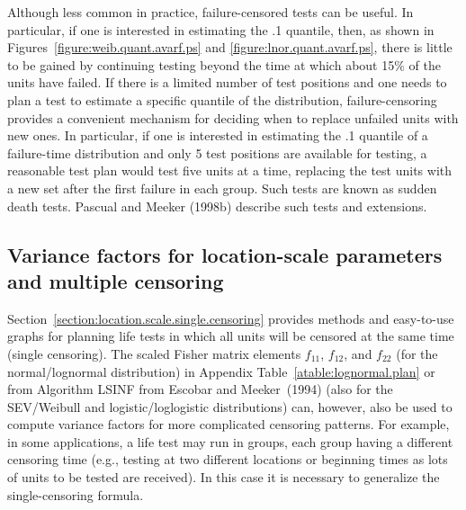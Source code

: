 Although less common in practice, failure-censored tests can be
useful. In particular, if one is interested in estimating the .1
quantile, then, as shown in Figures~\ref{figure:weib.quant.avarf.ps}
and
\ref{figure:lnor.quant.avarf.ps}, there is little to be gained by
continuing testing beyond the time at which about 15\% of
the units have failed.  If there is a limited number of test
positions and one needs to plan a test to estimate a specific
quantile of the distribution, failure-censoring provides a
convenient mechanism for deciding when to replace unfailed units
with new ones. In particular, if one is interested in estimating the
.1 quantile of a failure-time distribution and only 5 test positions
are available for testing, a reasonable test plan would test five
units at a time, replacing the test units with a new set after the
first failure in each group. Such tests are known as sudden death
tests. Pascual and Meeker (1998b) describe such tests and
extensions.

\subsection{Variance factors for location-scale 
	parameters and multiple censoring}
\label{section:location.scale.mul.censoring}
Section~\ref{section:location.scale.single.censoring} provides
methods and easy-to-use graphs for planning life tests in which all
units will be censored at the same time (single censoring).  The
scaled Fisher matrix elements $f_{11}$, $f_{12}$, and $f_{22}$ (for
the normal/lognormal distribution) in Appendix
Table~\ref{atable:lognormal.plan} or from Algorithm LSINF from
Escobar and Meeker~(1994) (also for the SEV/Weibull and
logistic/loglogistic distributions) can, however, also be used to
compute variance factors for more complicated censoring patterns.
For example, in some applications, a life test may run in groups,
each group having a different censoring time (e.g., testing at two
different locations or beginning times as lots of units to be tested
are received).  In this case it is necessary to generalize the
single-censoring formula.

